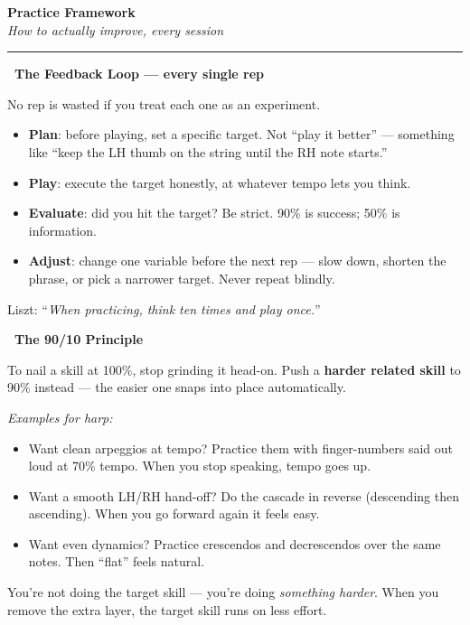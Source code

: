 \documentclass[letterpaper]{article}
\newcommand{\sect}[3]{%
  \noindent\begin{minipage}{\linewidth}%
  \colorbox{#1}{\color{white}\textbf{\ #2\ }}\par\vspace{1mm}
  #3
  \end{minipage}\par\vspace{3mm}%
}
\begin{document}
\begin{center}
{\fontsize{18}{22}\selectfont\textbf{Practice Framework}}\\[-1mm]
{\small\itshape How to actually improve, every session}
\end{center}
\vspace{2mm}
\hrule
\vspace{3mm}

\fontsize{10}{13}\selectfont

\sect{loopClr}{The Feedback Loop --- every single rep}{%
No rep is wasted if you treat each one as an experiment.
\begin{itemize}
  \item \textbf{Plan}: before playing, set a specific target. Not ``play it better'' --- something like ``keep the LH thumb on the string until the RH note starts.''
  \item \textbf{Play}: execute the target honestly, at whatever tempo lets you think.
  \item \textbf{Evaluate}: did you hit the target? Be strict. 90\% is success; 50\% is information.
  \item \textbf{Adjust}: change one variable before the next rep --- slow down, shorten the phrase, or pick a narrower target. Never repeat blindly.
\end{itemize}
Liszt: ``\textit{When practicing, think ten times and play once.}''
}

\sect{ratioClr}{The 90/10 Principle}{%
To nail a skill at 100\%, stop grinding it head-on. Push a \textbf{harder related skill} to 90\% instead --- the easier one snaps into place automatically.

\vspace{1mm}
\textit{Examples for harp:}
\begin{itemize}
  \item Want clean arpeggios at tempo? Practice them with finger-numbers said out loud at 70\% tempo. When you stop speaking, tempo goes up.
  \item Want a smooth LH/RH hand-off? Do the cascade in reverse (descending then ascending). When you go forward again it feels easy.
  \item Want even dynamics? Practice crescendos and decrescendos over the same notes. Then ``flat'' feels natural.
\end{itemize}
You're not doing the target skill --- you're doing \emph{something harder}. When you remove the extra layer, the target skill runs on less effort.
}
\end{document}
